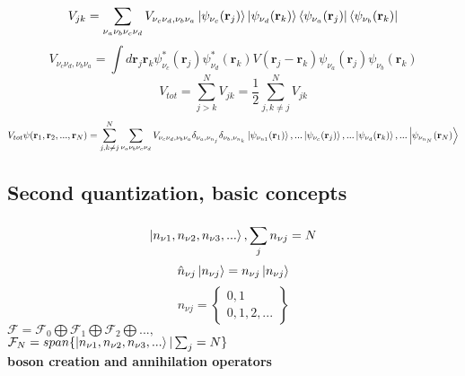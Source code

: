 \documentclass{article}
\begin{document}
\begin{equation*}
    V_{jk}=\sum_{\nu_a\nu_b\nu_c\nu_d}^{} V_{\nu_c\nu_d,\nu_b\nu_a} \ket{\psi_{\nu_c}(\textbf{r}_j)}\ket{\psi_{\nu_d}(\textbf{r}_k)}\bra{\psi_{\nu_a}(\textbf{r}_j)}\bra{\psi_{\nu_b}(\textbf{r}_k)}
\end{equation*}
\begin{equation*}
    V_{\nu_c\nu_d,\nu_b\nu_a}=\int d \textbf{r}_j\textbf{r}_k \psi_{\nu_c}^*(\textbf{r}_j)\psi_{\nu_d}^*(\textbf{r}_k) V(\textbf{r}_j-\textbf{r}_k)\psi_{\nu_a}(\textbf{r}_j)\psi_{\nu_b}(\textbf{r}_k)
\end{equation*}
\begin{equation*}
    V_{tot}=\sum_{j>k}^{N} V_{jk} =\frac{1}{2}\sum_{j,k\neq j}^{N} V_{jk}
\end{equation*}
\begin{equation*}
    V_{tot}\psi(\textbf{r}_1,\textbf{r}_2,...,\textbf{r}_N)=\sum_{j,k\neq j}^{N}\sum_{\nu_a\nu_b\nu_c\nu_d}^{}V_{\nu_c\nu_d,\nu_b\nu_a}\delta_{\nu_a,\nu_{n_j}}\delta_{\nu_b,\nu_{n_k}}\ket{\psi_{\nu_{n1}}(\textbf{r}_1)},...\ket{\psi_{\nu_{c}}(\textbf{r}_j)},...\ket{\psi_{\nu_{d}}(\textbf{r}_k)},...\ket{\psi_{\nu_{n_N}}(\textbf{r}_N)}
\end{equation*}
\subsection{Second quantization, basic concepts}
\begin{equation*}
    \ket{n_{\nu1},n_{\nu2},n_{\nu3},...} , \sum_{j}^{} n_{\nu j} = N
\end{equation*}
\begin{equation*}
    \hat{n}_{\nu j}\ket{n_{\nu j}} = n_{\nu j} \ket{n_{\nu j}}
\end{equation*}
\begin{equation*}
    n_{\nu j}=\begin{Bmatrix}
        0,1\\
        0,1,2,...
    \end{Bmatrix}
\end{equation*}
$\mathcal{F}=\mathcal{F}_0  \bigoplus\mathcal{F}_1  \bigoplus\mathcal{F}_2  \bigoplus...,$\\
$\mathcal{F}_N = span \{ \ket{n_{\nu1},n_{\nu2},n_{\nu3},...} | \sum_{j}^{}=N \} $ \\

\textbf{boson creation and annihilation operators}
\end{document}
